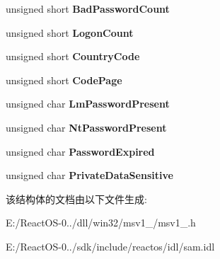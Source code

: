 \begin{DoxyCompactItemize}
\item 
\mbox{\label{struct___s_a_m_p_r___u_s_e_r___a_l_l___i_n_f_o_r_m_a_t_i_o_n_a07caa672627af90dde5322cb622dd8f7}} 
unsigned short {\bfseries Bad\+Password\+Count}
\item 
\mbox{\label{struct___s_a_m_p_r___u_s_e_r___a_l_l___i_n_f_o_r_m_a_t_i_o_n_a0c700e75148f91538cc3418783b7d0a2}} 
unsigned short {\bfseries Logon\+Count}
\item 
\mbox{\label{struct___s_a_m_p_r___u_s_e_r___a_l_l___i_n_f_o_r_m_a_t_i_o_n_a8683d34c10b64d424833c05957ea04e1}} 
unsigned short {\bfseries Country\+Code}
\item 
\mbox{\label{struct___s_a_m_p_r___u_s_e_r___a_l_l___i_n_f_o_r_m_a_t_i_o_n_a2321d29e21e7d154f9edf26e19ec09d5}} 
unsigned short {\bfseries Code\+Page}
\item 
\mbox{\label{struct___s_a_m_p_r___u_s_e_r___a_l_l___i_n_f_o_r_m_a_t_i_o_n_aae858d616b17cf622e41b9af95c73a30}} 
unsigned char {\bfseries Lm\+Password\+Present}
\item 
\mbox{\label{struct___s_a_m_p_r___u_s_e_r___a_l_l___i_n_f_o_r_m_a_t_i_o_n_aea88d71849ef0de7ebd229e3639b1389}} 
unsigned char {\bfseries Nt\+Password\+Present}
\item 
\mbox{\label{struct___s_a_m_p_r___u_s_e_r___a_l_l___i_n_f_o_r_m_a_t_i_o_n_a1e6ad77b21bf06d5983b90fa516f306f}} 
unsigned char {\bfseries Password\+Expired}
\item 
\mbox{\label{struct___s_a_m_p_r___u_s_e_r___a_l_l___i_n_f_o_r_m_a_t_i_o_n_a672fc4dde67cc482e3adf7978e5d3778}} 
unsigned char {\bfseries Private\+Data\+Sensitive}
\end{DoxyCompactItemize}


该结构体的文档由以下文件生成\+:\begin{DoxyCompactItemize}
\item 
E\+:/\+React\+O\+S-\/0../dll/win32/msv1\+\_/msv1\+\_.\+h\item 
E\+:/\+React\+O\+S-\/0../sdk/include/reactos/idl/sam.\+idl\end{DoxyCompactItemize}
